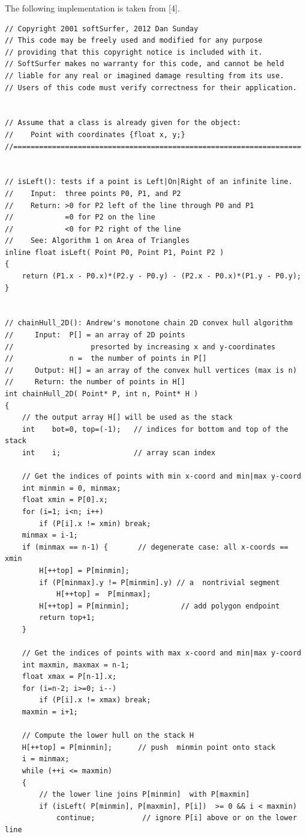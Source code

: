 \documentclass[12pt]{article}
\begin{document}
The following implementation is taken from [4].
\begin{lstlisting}
// Copyright 2001 softSurfer, 2012 Dan Sunday
// This code may be freely used and modified for any purpose
// providing that this copyright notice is included with it.
// SoftSurfer makes no warranty for this code, and cannot be held
// liable for any real or imagined damage resulting from its use.
// Users of this code must verify correctness for their application.
 

// Assume that a class is already given for the object:
//    Point with coordinates {float x, y;}
//===================================================================
 

// isLeft(): tests if a point is Left|On|Right of an infinite line.
//    Input:  three points P0, P1, and P2
//    Return: >0 for P2 left of the line through P0 and P1
//            =0 for P2 on the line
//            <0 for P2 right of the line
//    See: Algorithm 1 on Area of Triangles
inline float isLeft( Point P0, Point P1, Point P2 )
{
    return (P1.x - P0.x)*(P2.y - P0.y) - (P2.x - P0.x)*(P1.y - P0.y);
}


// chainHull_2D(): Andrew's monotone chain 2D convex hull algorithm
//     Input:  P[] = an array of 2D points 
//                  presorted by increasing x and y-coordinates
//             n =  the number of points in P[]
//     Output: H[] = an array of the convex hull vertices (max is n)
//     Return: the number of points in H[]
int chainHull_2D( Point* P, int n, Point* H )
{
    // the output array H[] will be used as the stack
    int    bot=0, top=(-1);   // indices for bottom and top of the stack
    int    i;                 // array scan index

    // Get the indices of points with min x-coord and min|max y-coord
    int minmin = 0, minmax;
    float xmin = P[0].x;
    for (i=1; i<n; i++)
        if (P[i].x != xmin) break;
    minmax = i-1;
    if (minmax == n-1) {       // degenerate case: all x-coords == xmin
        H[++top] = P[minmin];
        if (P[minmax].y != P[minmin].y) // a  nontrivial segment
            H[++top] =  P[minmax];
        H[++top] = P[minmin];            // add polygon endpoint
        return top+1;
    }

    // Get the indices of points with max x-coord and min|max y-coord
    int maxmin, maxmax = n-1;
    float xmax = P[n-1].x;
    for (i=n-2; i>=0; i--)
        if (P[i].x != xmax) break;
    maxmin = i+1;

    // Compute the lower hull on the stack H
    H[++top] = P[minmin];      // push  minmin point onto stack
    i = minmax;
    while (++i <= maxmin)
    {
        // the lower line joins P[minmin]  with P[maxmin]
        if (isLeft( P[minmin], P[maxmin], P[i])  >= 0 && i < maxmin)
            continue;           // ignore P[i] above or on the lower line


\end{lstlisting}
\end{document}
